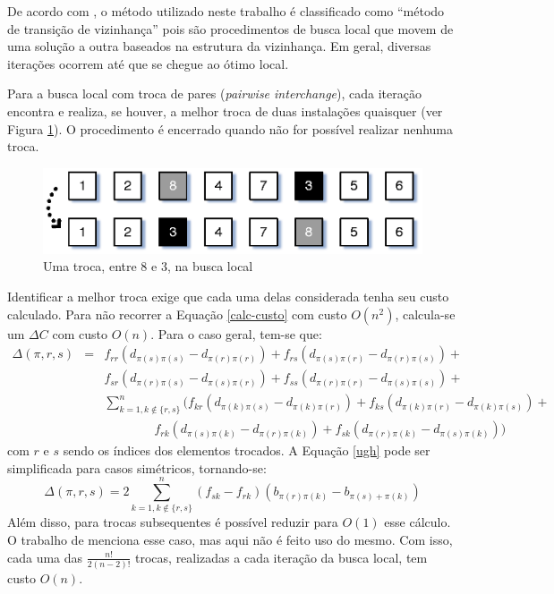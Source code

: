 De acordo com \cite{gutin-punnen}, o método utilizado neste trabalho é
classificado como ``método de transição de vizinhança'' pois são
procedimentos de busca local que movem de uma solução a outra baseados
na estrutura da vizinhança. Em geral, diversas iterações ocorrem até
que se chegue ao ótimo local.

Para a busca local com troca de pares (\textit{pairwise interchange}),
cada iteração encontra e realiza, se houver, a melhor troca de duas
instalações quaisquer (ver Figura \ref{fig:localstep}).
O procedimento é encerrado quando não for possível realizar nenhuma
troca.

\begin{figure}
  \centering
  \includegraphics[scale=0.65]{pairchange}
  \caption{Uma troca, entre 8 e 3, na busca local\label{fig:localstep}}
\end{figure}

Identificar a melhor troca exige que cada uma delas considerada tenha
seu custo calculado. Para não recorrer a Equação \ref{calc-custo} com
custo $O(n^2)$, calcula-se um $\Delta C$ com custo $O(n)$.
Para o caso geral, tem-se que:
\begin{eqnarray}\label{ugh}
\Delta(\pi, r, s) &=& f_{rr} (d_{\pi(s)\pi(s)} - d_{\pi(r)\pi(r)}) +
f_{rs} (d_{\pi(s)\pi(r)} - d_{\pi(r)\pi(s)}) + \nonumber \\
& & f_{sr} (d_{\pi(r)\pi(s)} - d_{\pi(s)\pi(r)}) + f_{ss} (d_{\pi(r)\pi(r)} -
d_{\pi(s)\pi(s)}) + \\
& & \sum_{k = 1, k \not \in \{r, s\}}^{n} (f_{kr} (d_{\pi(k)\pi(s)} -
d_{\pi(k)\pi(r)}) + f_{ks} (d_{\pi(k)\pi(r)} - d_{\pi(k)\pi(s)}) + \nonumber \\
& & \quad \quad \quad \quad f_{rk} (d_{\pi(s)\pi(k)} - d_{\pi(r)\pi(k)}) + f_{sk}
(d_{\pi(r)\pi(k)} - d_{\pi(s)\pi(k)})) \nonumber
\end{eqnarray}
com $r$ e $s$ sendo os índices dos elementos trocados. A Equação
\ref{ugh} pode ser simplificada para casos simétricos, tornando-se:
\begin{equation}
\Delta(\pi, r, s) = 2 \sum_{k = 1, k \not \in \{r, s\}}^{n} (f_{sk}
- f_{rk}) (b_{\pi(r)\pi(k)} - b_{\pi(s) + \pi(k)})
\end{equation}
Além disso, para trocas subsequentes é possível reduzir para $O(1)$
esse cálculo. O trabalho de \cite{taillard1} menciona esse caso, mas
aqui não é feito uso do mesmo. Com isso, cada uma das $\frac{n!}{2 (n -
  2)!}$ trocas, realizadas a cada iteração da busca local, tem custo
$O(n)$. %


